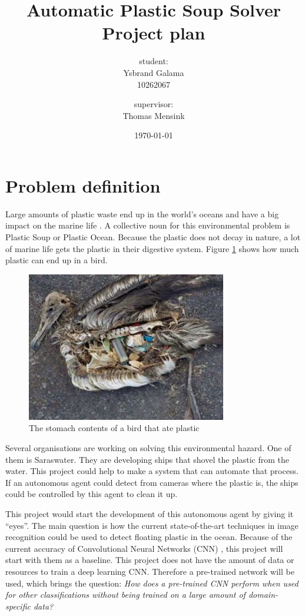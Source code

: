 \documentclass[a4paper, 11pt]{article}
\title{Automatic Plastic Soup Solver\\ {\Large Project plan}}
\author{student: \\Ysbrand Galama \\ 10262067 \and supervisor: \\ Thomas Mensink}
\date{\today}
\begin{document}
\maketitle

\section{Problem definition} 
Large amounts of plastic waste end up in the world's oceans and have a big impact on the marine life \citep{barnes2005drifting}.
A collective noun for this environmental problem is Plastic Soup or Plastic Ocean.
Because the plastic does not decay in nature, a lot of marine life gets the plastic in their digestive system. Figure \ref{fig:plastic-bird} shows how much plastic can end up in a bird.

\begin{figure}[h!bt]
\centering
\includegraphics[keepaspectratio=true,width=.5\textwidth]{images/Bird_with_plastic_stomach.jpg}
\caption{The stomach contents of a bird that ate plastic}
\label{fig:plastic-bird}
\end{figure}

Several organisations are working on solving this environmental hazard.
One of them is Saraswater.
They are developing ships that shovel the plastic from the water.
This project could help to make a system that can automate that process.
If an autonomous agent could detect from cameras where the plastic is, the ships could be controlled by this agent to clean it up.

This project would start the development of this autonomous agent by giving it ``eyes''. The main question is how the current state-of-the-art techniques in image recognition could be used to detect floating plastic in the ocean.
Because of the current accuracy of Convolutional Neural Networks (CNN) \citep{razavian2014cnn}, this project will start with them as a baseline.
This project does not have the amount of data or resources to train a deep learning CNN. Therefore a pre-trained network will be used, which brings the question:
{\it
How does a pre-trained CNN perform when used for other classifications without being trained on a large amount of domain-specific data?
}
\end{document}
